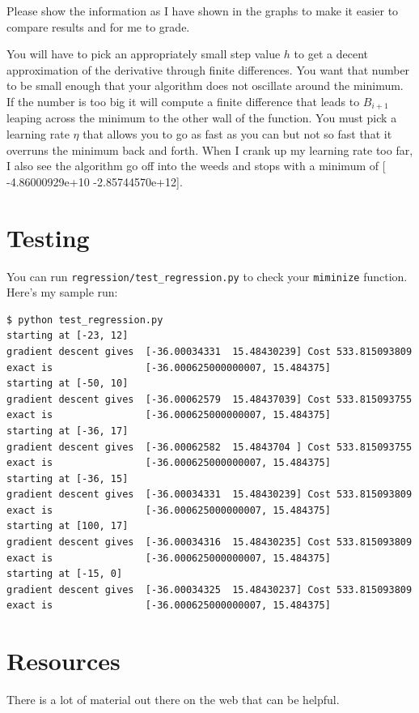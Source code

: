 \documentclass[titlepage]{tufte-book}
\begin{document}
\begin{fullwidth}
Please show the information as I have shown in the graphs to make it easier to compare results and for me to grade. 

You will have to pick an appropriately small step value $h$ to get a decent approximation of the derivative through finite differences. You want that number to be small enough that your algorithm does not oscillate around the minimum. If the number is too big it will compute a finite difference that leads to $B_{i+1}$ leaping across the minimum to the other wall of the function. You must pick a learning rate $\eta$ that allows you to go as fast as you can but not so fast that it overruns the minimum back and forth. When I crank up my learning rate too far, I also see the algorithm go off into the weeds and stops with a minimum of [ -4.86000929e+10  -2.85744570e+12].

\section{Testing}

You can run {\tt regression/test\_regression.py} to check your {\tt miminize} function.  Here's my sample run:

\begin{lstlisting}[style=BashInputStyle]
$ python test_regression.py
starting at [-23, 12]
gradient descent gives  [-36.00034331  15.48430239] Cost 533.815093809
exact is                [-36.000625000000007, 15.484375]
starting at [-50, 10]
gradient descent gives  [-36.00062579  15.48437039] Cost 533.815093755
exact is                [-36.000625000000007, 15.484375]
starting at [-36, 17]
gradient descent gives  [-36.00062582  15.4843704 ] Cost 533.815093755
exact is                [-36.000625000000007, 15.484375]
starting at [-36, 15]
gradient descent gives  [-36.00034331  15.48430239] Cost 533.815093809
exact is                [-36.000625000000007, 15.484375]
starting at [100, 17]
gradient descent gives  [-36.00034316  15.48430235] Cost 533.815093809
exact is                [-36.000625000000007, 15.484375]
starting at [-15, 0]
gradient descent gives  [-36.00034325  15.48430237] Cost 533.815093809
exact is                [-36.000625000000007, 15.484375]
\end{lstlisting}

\section{Resources}

There is a lot of material out there on the web that can be helpful.


\end{fullwidth}
\end{document}
